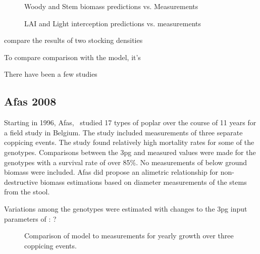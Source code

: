 \documentclass[10pt]{article}
\begin{document}
\begin{figure}
  \centering
  
  \caption{Woody and Stem biomass predictions vs. Measurements}
  \label{fig:proe-wood}
\end{figure}

\begin{figure}[!ht]
  \centering
  
  \caption{LAI and Light interception predictions vs. measurements}
  \label{fig:proe-light}
\end{figure}

\cite{proe02} compare the results of two stocking densities

To compare comparison with the
model, it's 

There have been a few studies



\subsection{Afas 2008}
\label{Afas2008}

Starting in 1996, Afas,~\cite{Afas2008a} studied 17 types of poplar
over the course of 11 years for a field study in Belgium.  The study
included measurements of three separate coppicing events.  The study
found relatively high mortality rates for some of the genotypes.
Comparisons between the \ac{3pg} and measured values were made for the
genotypes with a survival rate of over 85\%.  No measurements of below
ground biomass were included.  Afas did propose an alimetric
relationship for non-destructive biomass estimations based on diameter
measurements of the stems from the stool.

Variations among the genotypes were estimated with changes to the \ac{3pg}
input parameters of : ?

\begin{table}[!ht]
  \centering
    
  \caption{\ac{3pg} parameter variations of \ac{3pg} among genotypes}
  \label{tab:afas-3pg}
\end{table}

\begin{figure}[!ht]
  \centering

  \caption{Comparison of model to measurements for yearly growth over three
    coppicing events.}
\label{fig:afas-biomass}
\end{figure}
\end{document}
